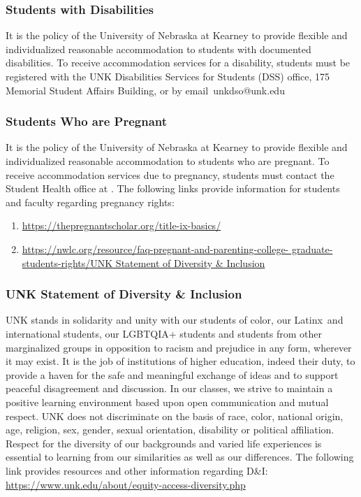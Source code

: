 \documentclass[12pt]{article}
\newcounter{ex}\setcounter{ex}{0}
\begin{document}
\subsubsection*{Students with Disabilities}

It is the policy of the University of Nebraska at Kearney to provide flexible and individualized reasonable accommodation to students with documented disabilities. To receive accommodation services for a disability, students must be registered with the UNK Disabilities Services for Students (DSS) office, 175 Memorial Student Affairs Building,   or by email unkdso@unk.edu  


\subsubsection*{Students Who are Pregnant}

It is the policy of the University of Nebraska at Kearney to provide flexible 
and individualized reasonable accommodation to students who are pregnant. 
To receive accommodation services due to pregnancy, students must contact 
the Student Health office at . The following 
links provide information for students and faculty regarding pregnancy 
rights:
\small
\begin{enumerate}
  \item \url{https://thepregnantscholar.org/title-ix-basics/}
  \item \url{https://nwlc.org/resource/faq-pregnant-and-parenting-college-
  graduate-students-rights/UNK Statement of Diversity & Inclusion}
\end{enumerate}
\normalsize

\subsubsection*{UNK Statement of Diversity \& Inclusion}

UNK stands in solidarity and unity with our students of color, our Latinx and international students, our LGBTQIA+ students 
and students from other marginalized groups in opposition to racism 
and prejudice in any form, wherever it may exist. It is the job of 
institutions of higher education, indeed their duty, to provide a 
haven for the safe and meaningful exchange of ideas and to support 
peaceful disagreement and discussion. In our classes, we strive to 
maintain a positive learning environment based upon open 
communication and mutual respect. UNK does not discriminate on the 
basis of race, color, national origin, age, religion, sex, gender, 
sexual orientation, disability or political affiliation. 
Respect for the diversity of our backgrounds and varied life 
experiences is essential to learning from our similarities as well 
as our differences. The following link provides resources and other 
information regarding D\&I: \url{https://www.unk.edu/about/equity-access-diversity.php}
\end{document}
